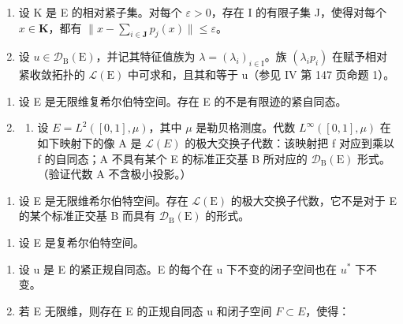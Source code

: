 \begin{enumerate}
\def\labelenumi{\alph{enumi})}
\item
  设 K 是 E 的相对紧子集。对每个 \(\varepsilon > 0\)，存在 I 的有限子集 J，使得对每个 \(x \in \mathbf{K}\)，都有 \(\|x - \sum_{i \in \mathbf{J}} p_j(x)\| \leqslant \varepsilon\)。
\item
  设 \(u \in \mathcal{D}_{\mathrm{B}}(\mathrm{E})\)，并记其特征值族为 \(\lambda = (\lambda_{i})_{i \in \mathrm{I}}\)。族 \((\lambda_{i} p_{i})\) 在赋予相对紧收敛拓扑的 \(\mathcal{L}(\mathrm{E})\) 中可求和，且其和等于 u（参见 IV 第 147 页命题 1）。
\end{enumerate}

\begin{enumerate}
\def\labelenumi{\arabic{enumi})}
\setcounter{enumi}{3}
\item
  设 E 是无限维复希尔伯特空间。存在 E 的不是有限迹的紧自同态。
\item
  \begin{enumerate}
  \def\labelenumii{\alph{enumii})}
  \tightlist
  \item
  设 \(E = L^{2}([0,1], \mu)\)，其中 \(\mu\) 是勒贝格测度。代数 \(L^{\infty}([0,1], \mu)\) 在如下映射下的像 A 是 \(\mathcal{L}(E)\) 的极大交换子代数：该映射把 f 对应到乘以 f 的自同态；A 不具有某个 E 的标准正交基 B 所对应的 \(\mathcal{D}_{\mathrm{B}}(\mathrm{E})\) 形式。（验证代数 A 不含极小投影。）
  \end{enumerate}
\end{enumerate}

\begin{enumerate}
\def\labelenumi{\alph{enumi})}
\setcounter{enumi}{1}
\tightlist
\item
  设 E 是无限维希尔伯特空间。存在 \(\mathcal{L}(\mathrm{E})\) 的极大交换子代数，它不是对于 E 的某个标准正交基 B 而具有 \(\mathcal{D}_{\mathrm{B}}(\mathrm{E})\) 的形式。
\end{enumerate}

\begin{enumerate}
\def\labelenumi{\arabic{enumi})}
\setcounter{enumi}{5}
\tightlist
\item
  设 E 是复希尔伯特空间。
\end{enumerate}

\begin{enumerate}
\def\labelenumi{\alph{enumi})}
\item
  设 u 是 E 的紧正规自同态。E 的每个在 u 下不变的闭子空间也在 \(u^{*}\) 下不变。
\item
  若 E 无限维，则存在 E 的正规自同态 u 和闭子空间 \(F \subset E\)，使得：
\end{enumerate}

